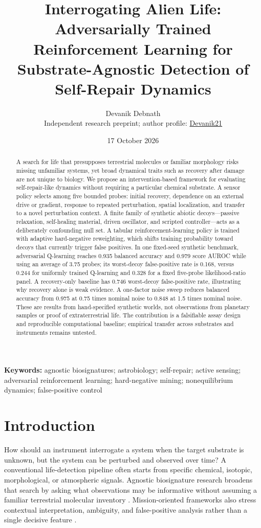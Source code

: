 \documentclass[11pt]{article}
\title{\vspace{-1.2em}\textbf{Interrogating Alien Life: Adversarially Trained Reinforcement Learning for Substrate-Agnostic Detection of Self-Repair Dynamics}}
\author{Devanik Debnath\\\small Independent research preprint; author profile: \href{https://github.com/Devanik21}{Devanik21}}
\date{17 October 2026}
\begin{document}
\maketitle

\begin{abstract}
A search for life that presupposes terrestrial molecules or familiar morphology risks missing unfamiliar systems, yet broad dynamical traits such as recovery after damage are not unique to biology. We propose an intervention-based framework for evaluating self-repair-like dynamics without requiring a particular chemical substrate. A sensor policy selects among five bounded probes: initial recovery, dependence on an external drive or gradient, response to repeated perturbation, spatial localization, and transfer to a novel perturbation context. A finite family of synthetic abiotic decoys---passive relaxation, self-healing material, driven oscillator, and scripted controller---acts as a deliberately confounding null set. A tabular reinforcement-learning policy is trained with adaptive hard-negative reweighting, which shifts training probability toward decoys that currently trigger false positives. In one fixed-seed synthetic benchmark, adversarial Q-learning reaches 0.935 balanced accuracy and 0.979 score AUROC while using an average of 3.75 probes; its worst-decoy false-positive rate is 0.168, versus 0.244 for uniformly trained Q-learning and 0.328 for a fixed five-probe likelihood-ratio panel. A recovery-only baseline has 0.746 worst-decoy false-positive rate, illustrating why recovery alone is weak evidence. A one-factor noise sweep reduces balanced accuracy from 0.975 at 0.75 times nominal noise to 0.848 at 1.5 times nominal noise. These are results from hand-specified synthetic worlds, not observations from planetary samples or proof of extraterrestrial life. The contribution is a falsifiable assay design and reproducible computational baseline; empirical transfer across substrates and instruments remains untested.
\end{abstract}

\textbf{Keywords:} agnostic biosignatures; astrobiology; self-repair; active sensing; adversarial reinforcement learning; hard-negative mining; nonequilibrium dynamics; false-positive control

\section{Introduction}
How should an instrument interrogate a system when the target substrate is unknown, but the system can be perturbed and observed over time? A conventional life-detection pipeline often starts from specific chemical, isotopic, morphological, or atmospheric signals. Agnostic biosignature research broadens that search by asking what observations may be informative without assuming a familiar terrestrial molecular inventory \citep{Graham2026Agnostic,Cleaves2023MLBiosignature}. Mission-oriented frameworks also stress contextual interpretation, ambiguity, and false-positive analysis rather than a single decisive feature \citep{Neveu2018Ladder,Malaterre2023Biosignature,Walker2018Exoplanet}.
\end{document}
